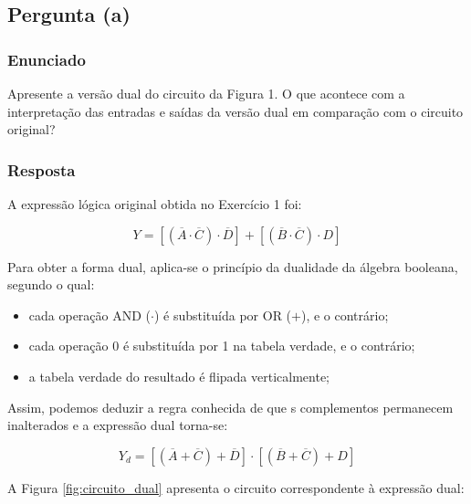 \documentclass[12pt]{article}
\begin{document}
\subsection{Pergunta (a)}

\subsubsection*{Enunciado}
Apresente a versão dual do circuito da Figura 1. O que acontece com a
interpretação das entradas e saídas da versão dual em comparação com o circuito
original? 

\subsubsection*{Resposta}

A expressão lógica original obtida no Exercício 1 foi:

\begin{equation}
Y = [(\overline{A}\cdot\overline{C})\cdot\overline{D}] + [(\overline{B}\cdot\overline{C})\cdot D]
\label{eq:original}
\end{equation}

Para obter a forma dual, aplica-se o princípio da dualidade da álgebra booleana, segundo o qual:

\begin{itemize}
    \item cada operação AND ($\cdot$) é substituída por OR ($+$), e o contrário;
    \item cada operação 0 é substituída por 1 na tabela verdade, e o contrário;
    \item a tabela verdade do resultado é flipada verticalmente;
\end{itemize}

Assim, podemos deduzir a regra conhecida de que s complementos permanecem inalterados e a expressão dual torna-se:

\begin{equation}
Y_d = [(\overline{A}+\overline{C})+\overline{D}] \cdot [(\overline{B}+\overline{C})+D]
\label{eq:dual}
\end{equation}

A Figura \ref{fig:circuito_dual} apresenta o circuito correspondente à expressão dual:
\end{document}
